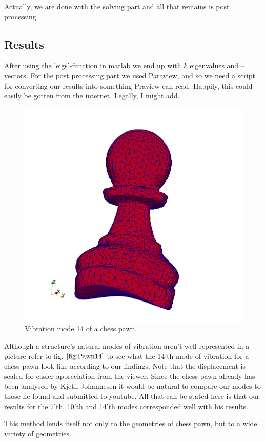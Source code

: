 \documentclass[paper=a4, fontsize=11pt]{scrartcl} %
\begin{document}
Actually, we are done with the solving part and all that remains is post processing.

\subsection*{Results}
After using the 'eigs'-function in matlab we end up with $k$ eigenvalues and --vectors. For the post processing part we used Paraview, and so we need a script for converting our results into something Praview can read. Happily, this could easily be gotten from the internet. Legally, I might add.
\begin{figure}
\centering
\includegraphics[scale=0.4]{PawnMode15.png}
\caption{Vibration mode 14 of a chess pawn.}
\label{fig:Pawn14}
\end{figure}
 Although a structure's natural modes of vibration aren't well-represented in a picture refer to fig. $\ref{fig:Pawn14}$ to see what the 14'th mode of vibration for a chess pawn look like according to our findings. Note that the displacement is scaled for easier appreciation from the viewer. Since the chess pawn already has been analysed by Kjetil Johannesen it would be natural to compare our modes to those he found and submitted to youtube. All that can be stated here is that our results for the 7'th, 10'th and 14'th modes corresponded well with his results.

This method lends itself not only to the geometries of chess pawn, but to a wide variety of geometries.
\end{document}
